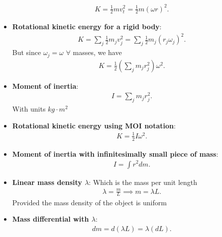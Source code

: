 \documentclass{report}
\begin{document}
\begin{itemize}
\begin{align*}
                K = \frac{1}{2}mv_{t}^{2} = \frac{1}{2}m(\omega r)^{2}
            .\end{align*}
        \item \textbf{Rotational kinetic energy for a rigid body}:
            \begin{align*}
                K = \sum_j \frac{1}{2}m_{j}v_{j}^{2} = \sum_j\frac{1}{2}m_{j}(r_{j}\omega_{j})^{2}
            .\end{align*}
            But since $\omega_{j} = \omega$ $\forall$ masses, we have
            \begin{align*}
                K = \frac{1}{2}\left(\sum_j m_{j}r_{j}^{2}\right)\omega^{2}
            .\end{align*}
        \item \textbf{Moment of inertia}:
            \begin{align*}
                I = \sum_j m_{j}r_{j}^{2}
            .\end{align*}
            With units $kg \cdot m^{2} $
        \item \textbf{Rotational kinetic energy using MOI notation}:
            \begin{align*}
                K = \frac{1}{2}I\omega^{2}
            .\end{align*}
        \item \textbf{Moment of inertia with infinitesimally small piece of mass}:
            \begin{align*}
                I = \int r^{2}dm
            .\end{align*}
        \item \textbf{Linear mass density $\lambda$}: Which is the mass per unit length
            \begin{align*}
                \lambda = \frac{m}{L} \implies m =\lambda L
            .\end{align*}
            Provided the mass density of the object is uniform
        \item \textbf{Mass differential with $\lambda$}:
            \begin{align*}
                dm = d(\lambda L) = \lambda (dL)
            .\end{align*}
            \bigbreak \noindent 

\end{itemize}
\end{document}
